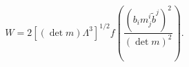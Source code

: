 \begin{equation}
  W = 2 [(\det m)\Lambda^{3}]^{1/2}
  f\left(\frac{(b_i m^i_{j} \tilde{b}^{{j}})^{2}}
  {(\det m)^2}\right).
\end{equation}

